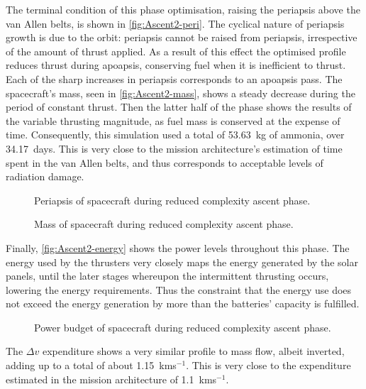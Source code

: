 The terminal condition of this phase optimisation, raising the periapsis above the van Allen belts, is shown in \autoref{fig:Ascent2-peri}. The cyclical nature of periapsis growth is due to the orbit: periapsis cannot be raised from periapsis, irrespective of the amount of thrust applied. As a result of this effect the optimised profile reduces thrust during apoapsis, conserving fuel when it is inefficient to thrust. Each of the sharp increases in periapsis corresponds to an apoapsis pass. The spacecraft's mass, seen in \autoref{fig:Ascent2-mass}, shows a steady decrease during the period of constant thrust. Then the latter half of the phase shows the results of the variable thrusting magnitude, as fuel mass is conserved at the expense of time. Consequently, this simulation used a total of 53.63~kg of ammonia, over 34.17~days. This is very close to the mission architecture's estimation of time spent in the van Allen belts, and thus corresponds to acceptable levels of radiation damage.

\begin{figure}
\caption{Periapsis of spacecraft during reduced complexity ascent phase.}
\label{fig:Ascent2-peri}
\centering
\def\svgwidth{\figurewidth}

\end{figure}

\begin{figure}
\caption{Mass of spacecraft during reduced complexity ascent phase.}
\label{fig:Ascent2-mass}
\centering
\def\svgwidth{\figurewidth}

\end{figure}

Finally, \autoref{fig:Ascent2-energy} shows the power levels throughout this phase. The energy used by the thrusters very closely maps the energy generated by the solar panels, until the later stages whereupon the intermittent thrusting occurs, lowering the energy requirements. Thus the constraint that the energy use does not exceed the energy generation by more than the batteries' capacity is fulfilled.

\begin{figure}
\caption{Power budget of spacecraft during reduced complexity ascent phase.}
\label{fig:Ascent2-energy}
\centering
\def\svgwidth{\figurewidth}

\end{figure}

The $\Delta v$ expenditure shows a very similar profile to mass flow, albeit inverted, adding up to a total of about 1.15~kms$^{-1}$. This is very close to the expenditure estimated in the mission architecture of 1.1~kms$^{-1}$.


